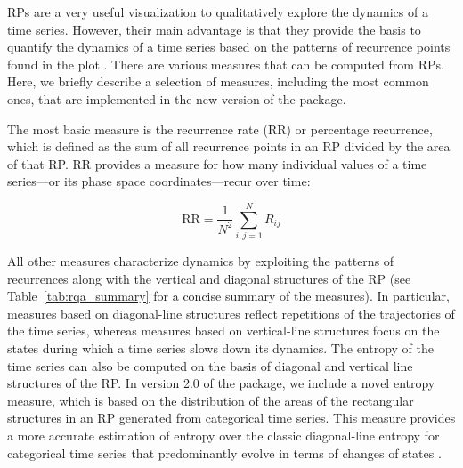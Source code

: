 RPs are a very useful visualization to qualitatively explore the dynamics of a time series. However, their main advantage is that they provide the basis to quantify the  dynamics of a time series based on the patterns of recurrence points found in the plot  \citep{zbilut1992embeddings}. There are various measures that can be computed from RPs. Here, we briefly describe a selection of measures, including the most common ones, that are implemented in the new version of the  package.

The most basic measure is the recurrence rate (RR) or percentage recurrence, which is defined as the sum of all recurrence points in an RP divided by the area of that RP. RR provides a measure for how many individual values of a time series---or its phase space coordinates---recur over time:

\begin{equation}
    \mathrm{RR} = \frac{1}{N^2} \sum_{i,j=1}^N R_{ij}
\end{equation}

All other measures characterize dynamics by exploiting the patterns of recurrences along with the vertical and diagonal structures of the RP (see Table~\ref{tab:rqa_summary} for a concise summary of the measures). In particular, measures based on diagonal-line structures reflect repetitions of the trajectories of the time series, whereas measures based on vertical-line structures focus on the states during which a time series slows down its dynamics. The entropy of the time series can also be computed on the basis of diagonal and vertical line structures of the RP. In version 2.0 of the  package, we include a novel entropy measure, which is based on the distribution of the areas of the rectangular structures in an RP generated from categorical time series. This measure provides a more accurate estimation of entropy over the classic diagonal-line entropy for categorical time series that predominantly evolve in terms of changes of states \citep{leonardi2018method}.

